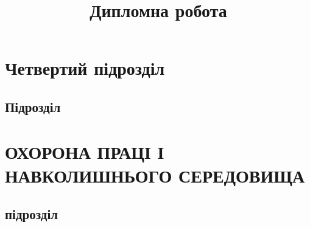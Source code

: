 \documentclass{stvuz_khpi}
\title{Дипломна робота}
\begin{document}
 
                   
                  
                   
\section{Четвертий підрозділ}
\subsection{Підрозділ}
\section{ОХОРОНА ПРАЦІ І НАВКОЛИШНЬОГО СЕРЕДОВИЩА}
\subsection{підрозділ}
\end{document}
